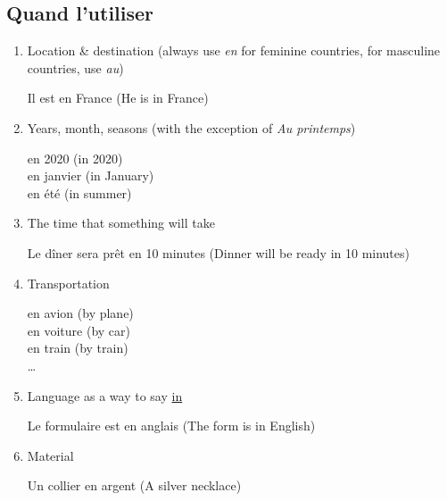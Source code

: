 \documentclass{book}
\begin{document}
        \subsection{Quand l'utiliser}
            \begin{enumerate}
                \item Location \& destination (always use \textit{en} for feminine countries, for masculine countries, use \textit{au})
                    \begin{center}
                        Il est en France (He is in France)
                    \end{center}
                \item Years, month, seasons (with the exception of \textit{Au printemps})
                    \begin{center}
                        en 2020 (in 2020) \\
                        en janvier (in January) \\
                        en été (in summer)
                    \end{center}
                \item The time that something will take
                    \begin{center}
                        Le dîner sera prêt en 10 minutes (Dinner will be ready in 10 minutes)
                    \end{center}
                \item Transportation
                    \begin{center}
                        en avion (by plane) \\
                        en voiture (by car) \\
                        en train (by train) \\
                        \dots
                    \end{center}
                \item Language as a way to say \underline{in}
                    \begin{center}
                        Le formulaire est en anglais (The form is in English)
                    \end{center}
                \item Material
                    \begin{center}
                        Un collier en argent (A silver necklace)
                    \end{center}

\end{enumerate}
\end{document}

